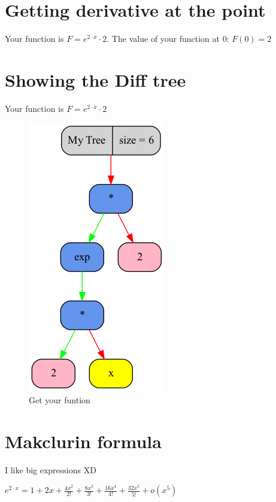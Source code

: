 \documentclass[12pt, letterpaper, twoside]{article}
\begin{document}
\section{Getting derivative at the point}
\begin{center}
Your function is $F = e^{2 \cdot x} \cdot 2$.
The value of your function at 0: $ F(0) = 2 $
\end{center}
\newpage
\section{Showing the Diff tree}
\begin{center}
Your function is $F = e^{2 \cdot x} \cdot 2$\newline 
\begin{figure}
\begin{center}
\includegraphics [scale = 0.4]{graphics/graph2.png}
\caption{Get your funtion}
\end{center}
\end{figure}
\end{center}
\newpage
\section{Makclurin formula}
I like big expressions XD\\
\begin{center}
$e^{2 \cdot x} =  1 +  2x + \frac{4x^{2}}{2!} + \frac{8x^{3}}{3!} + \frac{16x^{4}}{4!} + \frac{32x^{5}}{5!} + o(x^{5}) $
\end{center}
\end{document}
